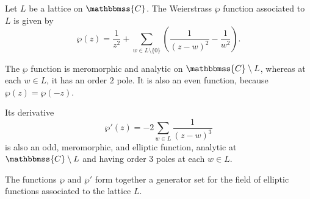 \documentclass[12pt]{article}
\newcommand{\C}{\mathbbmss{C}}
\begin{document}
  Let $L$ be a lattice on $\C$. The Weierstrass $\wp$ function associated to $L$ is given by 
\[
\wp(z) = \frac{1}{z^2} + \sum_{w\in L\setminus\{0\}} \left(\frac{1}{(z-w)^2} -  \frac{1}{w^2} \right).
\]

The $\wp$ function is meromorphic and analytic on $\C\setminus L$, whereas at each $w\in L$, it has an order $2$ pole. It is also an even function, because $\wp(z)=\wp(-z)$.

Its derivative 
\[
\wp'(z)=-2\sum_{w\in L} \frac{1}{(z-w)^3}
\]
is also an odd, meromorphic, and elliptic function, analytic at $\C\setminus L$ and having order $3$ poles at each $w\in L$.

The functions $\wp$ and $\wp'$ form together a generator set for the field of elliptic functions associated to the lattice $L$.
\end{document}
